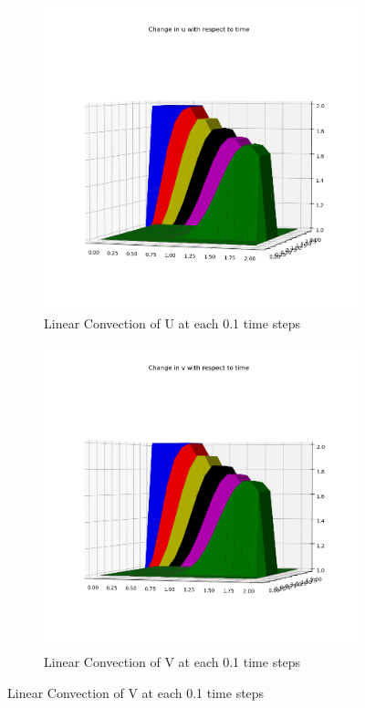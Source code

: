 \documentclass[conf]{new-aiaa}
\begin{document}
\begin{figure}[!h]
	\begin{subfigure}{0.5\textwidth}
		\centering
		\includegraphics[scale=0.35]{images/u_c.png}
		\caption{Linear Convection of U at each 0.1 time steps}
		\label{fig:03}
	\end{subfigure}
	\begin{subfigure}{0.5\textwidth}
		\centering
		\includegraphics[scale=0.35]{images/v_c.png}
		\caption{Linear Convection of V at each 0.1 time steps}
		\label{fig:04}
	\end{subfigure}
\end{figure}
\end{document}
